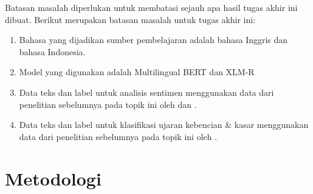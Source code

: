 Batasan masalah diperlukan untuk membatasi sejauh apa hasil tugas akhir ini dibuat. Berikut merupakan batasan masalah untuk tugas akhir ini:
\begin{enumerate}
	\item Bahasa yang dijadikan sumber pembelajaran adalah bahasa Inggris dan bahasa Indonesia.
	\item Model yang digunakan adalah Multilingual BERT \parencite{Devlin_Chang_Lee_Toutanova_2019} dan XLM-R \parencite{Conneau_XLMR}
	\item Data teks dan label untuk analisis sentimen menggunakan data dari penelitian sebelumnya pada topik ini oleh \parencite{CrisdayantiPurwarianti2019} dan \parencite{FarhanKhodra2017}.
	\item Data teks dan label untuk klasifikasi ujaran kebencian \& kasar menggunakan data dari penelitian sebelumnya pada topik ini oleh \parencite{Ibrohim_Budi_2019}.
\end{enumerate}

\section{Metodologi}

